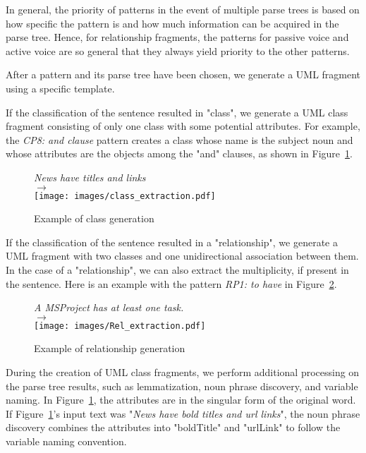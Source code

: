 \documentclass[sigconf]{acmart}
\begin{document}
In general, the priority of patterns in the event of multiple parse trees is based on how specific the pattern is and how much information can be acquired in the parse tree. Hence, for relationship fragments, the patterns for passive voice and active voice are so general that they always yield priority to the other patterns.

After a pattern and its parse tree have been chosen, we generate a UML fragment using a specific template.

If the classification of the sentence resulted in "class", we generate a  UML class fragment consisting of only one class with some potential attributes. For example, the \textit{CP8: and clause} pattern creates a class whose name is the subject noun and whose attributes are the objects among the "and" clauses, as shown in Figure~\ref{fig:class_generation}.

\begin{figure}[h]
    \centering
    \textit{News have titles and links} \\
    $\longrightarrow$ \\
    \texttt{[image: images/class\_extraction.pdf]}
    \caption{Example of class generation}
    \label{fig:class_generation}
\end{figure}

If the classification of the sentence resulted in a  "relationship", we generate a UML fragment with two classes and one unidirectional association between them. In the case of a "relationship", we can also extract the multiplicity, if present in the sentence. Here is an example with the pattern \textit{RP1: to have} in Figure~\ref{fig:relation_generation}.

\begin{figure}[h]
    \centering
    \textit{A MSProject has at least one task.} \\
    $\longrightarrow$ \\
    \texttt{[image: images/Rel\_extraction.pdf]}
    \caption{Example of relationship generation}
    \label{fig:relation_generation}
\end{figure}

During the creation of UML class fragments, we perform additional processing on the parse tree results, such as lemmatization, noun phrase discovery, and variable naming. In Figure~\ref{fig:class_generation}, the attributes are in the singular form of the original word. If Figure~\ref{fig:class_generation}'s input text was "\textit{News have bold titles and url links}", the noun phrase discovery combines the attributes into "boldTitle" and "urlLink" to follow the variable naming convention.
\end{document}
